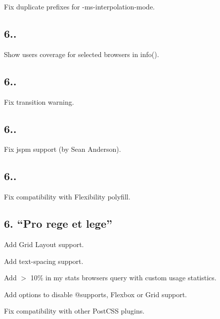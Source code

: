 \begin{DoxyItemize}
\item Fix duplicate prefixes for {\ttfamily -\/ms-\/interpolation-\/mode}.
\end{DoxyItemize}

\subsection*{6..}


\begin{DoxyItemize}
\item Show users coverage for selected browsers in {\ttfamily info()}.
\end{DoxyItemize}

\subsection*{6..}


\begin{DoxyItemize}
\item Fix transition warning.
\end{DoxyItemize}

\subsection*{6..}


\begin{DoxyItemize}
\item Fix jspm support (by Sean Anderson).
\end{DoxyItemize}

\subsection*{6..}


\begin{DoxyItemize}
\item Fix compatibility with Flexibility polyfill.
\end{DoxyItemize}

\subsection*{6. “\+Pro rege et lege”}


\begin{DoxyItemize}
\item Add Grid Layout support.
\item Add {\ttfamily text-\/spacing} support.
\item Add {\ttfamily $>$ 10\% in my stats} browsers query with custom usage statistics.
\item Add options to disable {\ttfamily @supports}, Flexbox or Grid support.
\item Fix compatibility with other Post\+C\+SS plugins.
\end{DoxyItemize}

